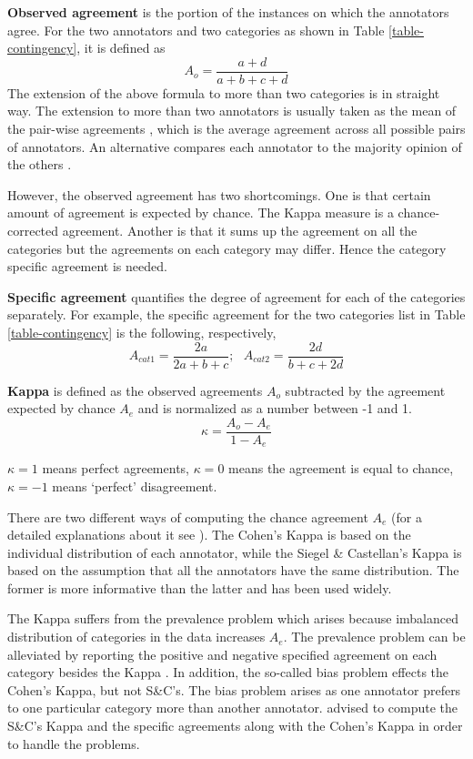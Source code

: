 {\bf Observed agreement} is the portion of the instances on which the 
annotators agree. For the two annotators and two categories as shown in
 Table \ref{table-contingency}, it is defined as
\begin{equation}
A_{o} = \frac{a+d}{a+b+c+d}
\end{equation}
The extension of the above formula to more than two categories is in 
straight way. The extension to more than two annotators is usually taken 
as the mean of the pair-wise agreements \cite{Fleiss75}, which is the average agreement 
across all possible pairs of annotators. 
An alternative compares each annotator to the majority opinion of the others 
\cite{Fleiss75}.

However, the observed agreement has two shortcomings. One is that certain 
amount of agreement is expected by chance. The Kappa measure is a chance-corrected 
agreement. Another is that it sums up the agreement on all the categories but 
the agreements on each category may differ. Hence the category specific agreement 
is needed.

{\bf Specific agreement} quantifies the degree of agreement for each of the categories 
separately. For example, the specific agreement for the two categories list in 
Table \ref{table-contingency} is the following, respectively,
\begin{equation}
A_{cat1} = \frac{2a}{2a+b+c}; \ \ \
A_{cat2} = \frac{2d}{b+c+2d}
\end{equation}

{\bf Kappa} is defined as the observed agreements $A_{o}$ subtracted by the agreement 
expected by chance $A_{e}$ and is normalized as a number between -1 and 1.
\begin{equation}
\kappa =\frac{A_{o}-A_{e}}{1-A_{e}}
\end{equation}

$\kappa=1$ means perfect agreements, $\kappa=0$ means the agreement is equal to 
chance, $\kappa=-1$ means `perfect' disagreement.

There are two different ways of computing the chance agreement $A_{e}$
(for a detailed explanations about it see
\cite{Eugenio04}). The Cohen's Kappa is based on the individual distribution of 
each annotator, while the Siegel \& Castellan's Kappa is based on the assumption that all 
the annotators have the same distribution. The former is more informative than the 
latter and has been used widely. 

The Kappa suffers from the prevalence problem which arises because imbalanced 
distribution of categories in the data increases $A_{e}$. The prevalence problem can be 
alleviated by reporting the positive and negative specified  agreement on each category 
besides the Kappa \cite{ Hripcsak02, Eugenio04}. In addition, the so-called bias 
problem effects the Cohen's Kappa, but not S\&C's. The bias problem arises as one 
annotator prefers to one particular category more than another annotator.
\cite{ Eugenio04} advised to compute the S\&C's Kappa and the specific agreements along
with the Cohen's Kappa in order to handle the problems.

